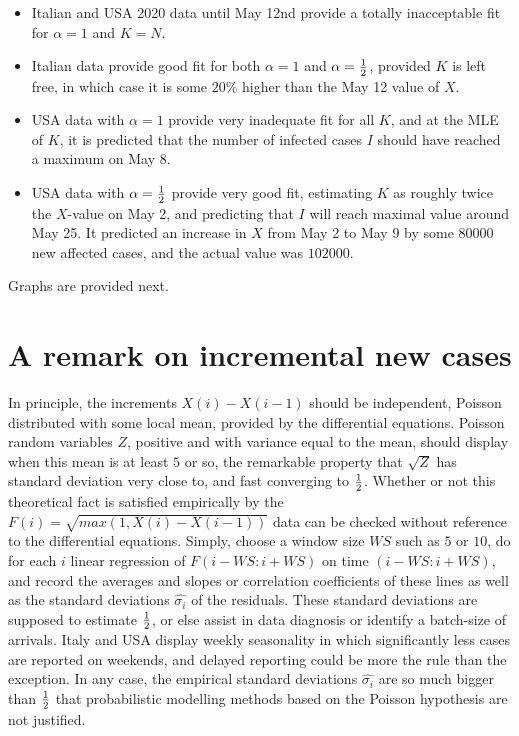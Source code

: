 \documentclass{article}
\begin{document}
{\begin{itemize}

\item Italian and USA 2020 data until May 12nd provide a totally inacceptable fit for $\alpha=1$ and $K=N$.

\item Italian data provide good fit for both $\alpha=1$ and $\alpha={1 \over 2}$, provided $K$ is left free, in which case it is some $20\%$ higher than the May 12 value of $X$.

\item USA data with $\alpha=1$ provide very inadequate fit for all $K$, and at the MLE of $K$, it is predicted that the number of infected cases $I$ should have reached a maximum on May 8.

\item USA data with $\alpha={1 \over 2}$ provide very good fit, estimating $K$ as roughly twice the $X$-value on May 2, and predicting that $I$ will reach maximal value around May 25. It predicted an increase in $X$ from May 2 to May 9 by some $80000$ new affected cases, and the actual value was $102000$.

\end{itemize}

Graphs are provided next.

\section{A remark on incremental new cases} \label{More}

In principle, the increments $X(i)-X(i-1)$ should be independent, Poisson distributed with some local mean, provided by the differential equations. Poisson random variables $Z$, positive and with variance equal to the mean, should display when this mean is at least $5$ or so, the remarkable property that $\sqrt{Z}$ has standard deviation very close to, and fast converging to ${1 \over 2}$. Whether or not this theoretical fact is satisfied empirically by the $F(i)=\sqrt{max(1,X(i)-X(i-1))}$ data can be checked without reference to the differential equations. Simply, choose a window size $WS$ such as $5$ or $10$, do for each $i$ linear regression of $F(i-WS:i+WS)$ on time $(i-WS:i+WS)$, and record the averages and slopes or correlation coefficients of these lines as well as the standard deviations $\hat{\sigma_i}$ of the residuals. These standard deviations are supposed to estimate ${1 \over 2}$, or else assist in data diagnosis or identify a batch-size of arrivals. Italy and USA display weekly seasonality in which significantly less cases are reported on weekends, and delayed reporting could be more the rule than the exception. In any case, the empirical standard deviations $\hat{\sigma_i}$ are so much bigger than ${1 \over 2}$ that probabilistic modelling methods based on the Poisson hypothesis are not justified.

}
\end{document}
